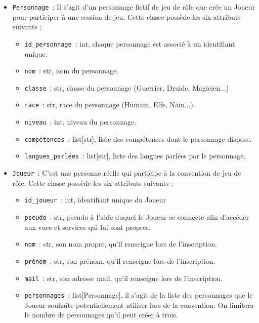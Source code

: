 \documentclass[11pt]{article}
\begin{document}
\begin{itemize}
    \item \texttt{Personnage}~: Il s'agit d'un personnage fictif de jeu de rôle que crée un Joueur pour participer à une session de jeu. Cette classe possède les six attributs suivants :
    \begin{itemize}[label=, font=\small]
        \item \texttt{id\_personnage}~: int, chaque personnage est associé à un identifiant unique.
        \item \texttt{nom}~: str, nom du personnage.
        \item \texttt{classe}~: str, classe du personnage (Guerrier, Druide, Magicien...)
        \item \texttt{race}~: str, race du personnage (Humain, Elfe, Nain...).
        \item \texttt{niveau}~: int, niveau du personnage.
        \item \texttt{compétences}~: list[str], liste des compétences dont le personnage dispose.
        \item \texttt{langues\_parlées}~: list[str], liste des langues parlées par le personnage.
    \end{itemize}

    \item \texttt{Joueur}~: C'est une personne réelle qui participe à la convention de jeu de rôle. Cette classe possède les six attributs suivants :
    \begin{itemize}[label=, font=\small]
        \item \texttt{id\_joueur}~: int, identifiant unique du Joueur
        \item \texttt{pseudo}~: str, pseudo à l'aide duquel le Joueur se connecte afin d'accéder aux vues et services qui lui sont propres.
        \item \texttt{nom}~: str, son nom propre, qu'il renseigne lors de l'inscription.
        \item \texttt{prénom}~: str, son prénom, qu'il renseigne lors de l'inscription.
        \item \texttt{mail}~: str, son adresse mail, qu'il renseigne lors de l'inscription.
        \item \texttt{personnages}~: list[Personnage], il s'agit de la liste des personnages que le Joueur souhaite potentiellement utiliser lors de la convention. On limitera le nombre de personnages qu'il peut créer à trois.
    \end{itemize}
\end{itemize}
\end{document}
